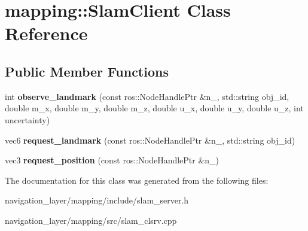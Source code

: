 \hypertarget{classmapping_1_1SlamClient}{}\section{mapping\+:\+:Slam\+Client Class Reference}
\label{classmapping_1_1SlamClient}
\subsection*{Public Member Functions}
\begin{DoxyCompactItemize}
\item 
\mbox{\label{classmapping_1_1SlamClient_a299d2c90d5875afbca338224cbbf90e3}} 
int {\bfseries observe\+\_\+landmark} (const ros\+::\+Node\+Handle\+Ptr \&n\+\_\+, std\+::string obj\+\_\+id, double m\+\_\+x, double m\+\_\+y, double m\+\_\+z, double u\+\_\+x, double u\+\_\+y, double u\+\_\+z, int uncertainty)
\item 
\mbox{\label{classmapping_1_1SlamClient_a8545e038389dd0b8104ddb7fb1ee29a6}} 
vec6 {\bfseries request\+\_\+landmark} (const ros\+::\+Node\+Handle\+Ptr \&n\+\_\+, std\+::string obj\+\_\+id)
\item 
\mbox{\label{classmapping_1_1SlamClient_a527043a9270a56bd56caf97f66afa117}} 
vec3 {\bfseries request\+\_\+position} (const ros\+::\+Node\+Handle\+Ptr \&n\+\_\+)
\end{DoxyCompactItemize}


The documentation for this class was generated from the following files\+:\begin{DoxyCompactItemize}
\item 
navigation\+\_\+layer/mapping/include/slam\+\_\+server.\+h\item 
navigation\+\_\+layer/mapping/src/slam\+\_\+clsrv.\+cpp\end{DoxyCompactItemize}

